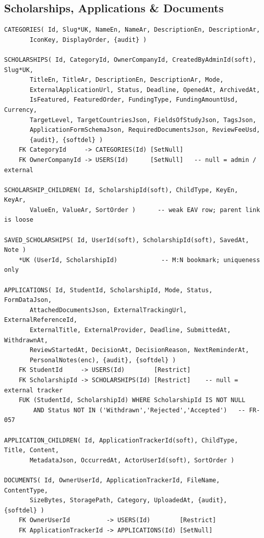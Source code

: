 \documentclass[11pt,a4paper]{article}
\begin{document}
\subsection{Scholarships, Applications \& Documents}
{\footnotesize\begin{verbatim}
CATEGORIES( Id, Slug*UK, NameEn, NameAr, DescriptionEn, DescriptionAr,
       IconKey, DisplayOrder, {audit} )

SCHOLARSHIPS( Id, CategoryId, OwnerCompanyId, CreatedByAdminId(soft), Slug*UK,
       TitleEn, TitleAr, DescriptionEn, DescriptionAr, Mode,
       ExternalApplicationUrl, Status, Deadline, OpenedAt, ArchivedAt,
       IsFeatured, FeaturedOrder, FundingType, FundingAmountUsd, Currency,
       TargetLevel, TargetCountriesJson, FieldsOfStudyJson, TagsJson,
       ApplicationFormSchemaJson, RequiredDocumentsJson, ReviewFeeUsd,
       {audit}, {softdel} )
    FK CategoryId     -> CATEGORIES(Id) [SetNull]
    FK OwnerCompanyId -> USERS(Id)      [SetNull]   -- null = admin / external

SCHOLARSHIP_CHILDREN( Id, ScholarshipId(soft), ChildType, KeyEn, KeyAr,
       ValueEn, ValueAr, SortOrder )      -- weak EAV row; parent link is loose

SAVED_SCHOLARSHIPS( Id, UserId(soft), ScholarshipId(soft), SavedAt, Note )
    *UK (UserId, ScholarshipId)            -- M:N bookmark; uniqueness only

APPLICATIONS( Id, StudentId, ScholarshipId, Mode, Status, FormDataJson,
       AttachedDocumentsJson, ExternalTrackingUrl, ExternalReferenceId,
       ExternalTitle, ExternalProvider, Deadline, SubmittedAt, WithdrawnAt,
       ReviewStartedAt, DecisionAt, DecisionReason, NextReminderAt,
       PersonalNotes(enc), {audit}, {softdel} )
    FK StudentId     -> USERS(Id)        [Restrict]
    FK ScholarshipId -> SCHOLARSHIPS(Id) [Restrict]    -- null = external tracker
    FUK (StudentId, ScholarshipId) WHERE ScholarshipId IS NOT NULL
        AND Status NOT IN ('Withdrawn','Rejected','Accepted')   -- FR-057

APPLICATION_CHILDREN( Id, ApplicationTrackerId(soft), ChildType, Title, Content,
       MetadataJson, OccurredAt, ActorUserId(soft), SortOrder )

DOCUMENTS( Id, OwnerUserId, ApplicationTrackerId, FileName, ContentType,
       SizeBytes, StoragePath, Category, UploadedAt, {audit}, {softdel} )
    FK OwnerUserId          -> USERS(Id)        [Restrict]
    FK ApplicationTrackerId -> APPLICATIONS(Id) [SetNull]


\end{verbatim}}
\end{document}
